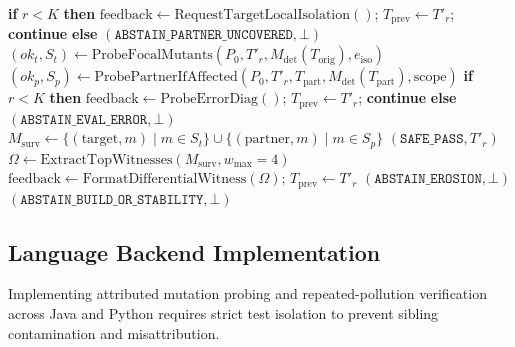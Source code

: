 \begin{algorithm}[t]
\begin{algorithmic}[1]
    \EndIf
        \State \textbf{if} $r < K$ \textbf{then} $\text{feedback} \gets \text{RequestTargetLocalIsolation}()$; $T_{\text{prev}} \gets T'_r$; \textbf{continue}
        \State \textbf{else} \Return $(\texttt{ABSTAIN\_PARTNER\_UNCOVERED}, \bot)$ 
    \EndIf
    \State $(ok_t, S_t) \gets \text{ProbeFocalMutants}(P_0, T'_r, M_{\text{det}}(T_{\text{orig}}), e_{\text{iso}})$
    \State $(ok_p, S_p) \gets \text{ProbePartnerIfAffected}(P_0, T'_r, T_{\text{part}}, M_{\text{det}}(T_{\text{part}}), \text{scope})$
        \State \textbf{if} $r < K$ \textbf{then} $\text{feedback} \gets \text{ProbeErrorDiag}()$; $T_{\text{prev}} \gets T'_r$; \textbf{continue}
        \State \textbf{else} \Return $(\texttt{ABSTAIN\_EVAL\_ERROR}, \bot)$ 
    \EndIf
    \State $M_{\text{surv}} \gets \{(\text{target}, m) \mid m \in S_t\} \cup \{(\text{partner}, m) \mid m \in S_p\}$
        \State \Return $(\texttt{SAFE\_PASS}, T'_r)$
        \State $\Omega \gets \text{ExtractTopWitnesses}(M_{\text{surv}}, w_{\max}=4)$ 
        \State $\text{feedback} \gets \text{FormatDifferentialWitness}(\Omega)$; $T_{\text{prev}} \gets T'_r$
    \Else
        \State \Return $(\texttt{ABSTAIN\_EROSION}, \bot)$
    \EndIf
\EndFor
\State \Return $(\texttt{ABSTAIN\_BUILD\_OR\_STABILITY}, \bot)$
\end{algorithmic}
\end{algorithm}

\subsection{Language Backend Implementation}
\label{sec:impl}

Implementing attributed mutation probing and repeated-pollution verification across Java and Python requires strict test isolation to prevent sibling contamination and misattribution.

